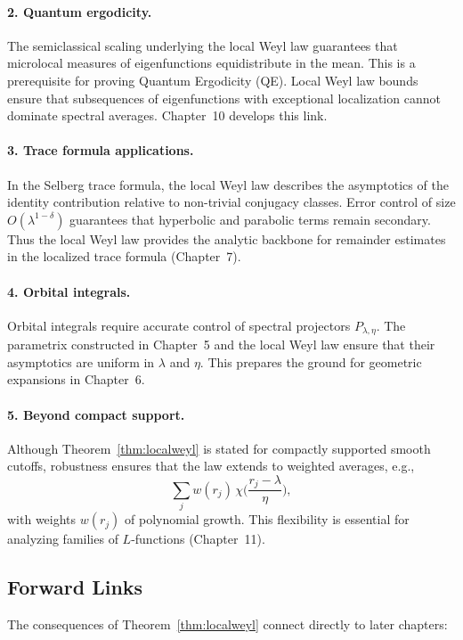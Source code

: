 \paragraph{2. Quantum ergodicity.}
The semiclassical scaling underlying the local Weyl law guarantees that microlocal measures of eigenfunctions equidistribute in the mean.  
This is a prerequisite for proving Quantum Ergodicity (QE).  
Local Weyl law bounds ensure that subsequences of eigenfunctions with exceptional localization cannot dominate spectral averages.  
Chapter~10 develops this link.

\paragraph{3. Trace formula applications.}
In the Selberg trace formula, the local Weyl law describes the asymptotics of the identity contribution relative to non-trivial conjugacy classes.  
Error control of size $O(\lambda^{1-\delta})$ guarantees that hyperbolic and parabolic terms remain secondary.  
Thus the local Weyl law provides the analytic backbone for remainder estimates in the localized trace formula (Chapter~7).

\paragraph{4. Orbital integrals.}
Orbital integrals require accurate control of spectral projectors $P_{\lambda,\eta}$.  
The parametrix constructed in Chapter~5 and the local Weyl law ensure that their asymptotics are uniform in $\lambda$ and $\eta$.  
This prepares the ground for geometric expansions in Chapter~6.

\paragraph{5. Beyond compact support.}
Although Theorem~\ref{thm:localweyl} is stated for compactly supported smooth cutoffs, robustness ensures that the law extends to weighted averages, e.g.,
\[
\sum_j w(r_j)\,\chi\!\Big(\frac{r_j-\lambda}{\eta}\Big),
\]
with weights $w(r_j)$ of polynomial growth.  
This flexibility is essential for analyzing families of $L$-functions (Chapter~11).

\subsection{Forward Links}

The consequences of Theorem~\ref{thm:localweyl} connect directly to later chapters:

